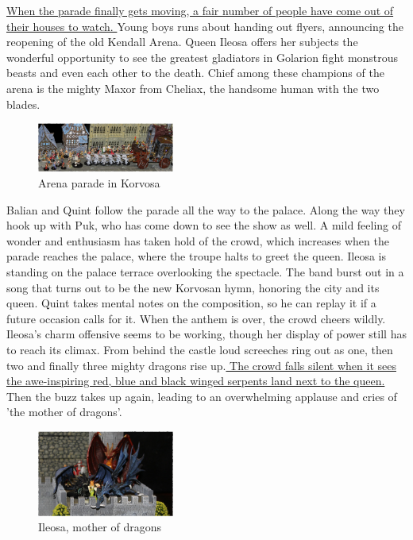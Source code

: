 \hyperref[fig:Arena-parade-in-Korvosa-613132167]{ When the parade finally gets moving, a fair number of people have come out of their houses to watch. } Young boys runs about handing out flyers, announcing the reopening of the old Kendall Arena. Queen Ileosa offers her subjects the wonderful opportunity to see the greatest gladiators in Golarion fight monstrous beasts and even each other to the death. Chief among these champions of the arena is the mighty Maxor from Cheliax, the handsome human with the two blades. \\

\begin{figure}[h]
	\centering
	\includegraphics[width=0.4\textwidth]{images/Arena-parade-in-Korvosa-613132167_mod.jpg}
	\caption{Arena parade in Korvosa}
	\label{fig:Arena-parade-in-Korvosa-613132167}
\end{figure}

Balian and Quint follow the parade all the way to the palace. Along the way they hook up with Puk, who has come down to see the show as well. A mild feeling of wonder and enthusiasm has taken hold of the crowd, which increases when the parade reaches the palace, where the troupe halts to greet the queen. Ileosa is standing on the palace terrace overlooking the spectacle. The band burst out in a song that turns out to be the new Korvosan hymn, honoring the city and its queen. Quint takes mental notes on the composition, so he can replay it if a future occasion calls for it. When the anthem is over, the crowd cheers wildly. Ileosa's charm offensive seems to be working, though her display of power still has to reach its climax. From behind the castle loud screeches ring out as one, then two and finally three mighty dragons rise up.\hyperref[fig:Ileosa-mother-of-dragons-613162775]{ The crowd falls silent when it sees the awe-inspiring red, blue and black winged serpents land next to the queen. } Then the buzz takes up again, leading to an overwhelming applause and cries of 'the mother of dragons'. \\

\begin{figure}[h]
	\centering
	\includegraphics[width=0.4\textwidth]{images/Ileosa-mother-of-dragons-613162775_mod.jpg}
	\caption{Ileosa, mother of dragons}
	\label{fig:Ileosa-mother-of-dragons-613162775}
\end{figure}

